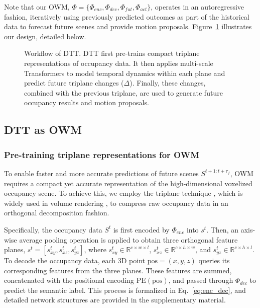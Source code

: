 \documentclass[11pt,a4paper]{article}
\begin{document}
Note that our OWM, $\Phi = \{\Phi_{enc}, \Phi_{dec}, \Phi_{fut}, \Phi_{act}\}$, operates in an autoregressive fashion, iteratively using previously predicted outcomes as part of the historical data to forecast future scenes and provide motion proposals.
Figure~\ref{fig:workflow} illustrates our design, detailed below.

\begin{figure}[htbp]
  \centering
  \caption{Workflow of DTT. DTT first pre-trains compact triplane representations of occupancy data. It then applies multi-scale Transformers to model temporal dynamics within each plane and predict future triplane changes ($\Delta$). Finally, these changes, combined with the previous triplane, are used to generate future occupancy results and motion proposals.}
  \label{fig:workflow}
\end{figure}

\subsection{DTT as OWM}

\subsubsection{Pre-training triplane representations for OWM}

To enable faster and more accurate predictions of future scenes $S^{t+1:t+\tau_f}$, OWM requires a compact yet accurate representation of the high-dimensional voxelized occupancy scene.
To achieve this, we employ the triplane technique \cite{juminlee2024}, which is widely used in volume rendering \cite{jryanshue2023,taohu2023,luchuansong2024,yuanhuihuang2023}, to compress raw occupancy data in an orthogonal decomposition fashion.

Specifically, the occupancy data $S^t$ is first encoded by $\Phi_{enc}$ into $s^t$.
Then, an axis-wise average pooling operation is applied to obtain three orthogonal feature planes,
$s^t = [s^t_{xy}, s^t_{xz}, s^t_{yz}]$, where $s^t_{xy} \in \mathbb{R}^{c \times w \times l}$, $s^t_{xz} \in \mathbb{R}^{c \times h \times w}$, and $s^t_{yz} \in \mathbb{R}^{c \times h \times l}$.
To decode the occupancy data, each 3D point $\text{pos} = (x, y, z)$ queries its corresponding features from the three planes.
These features are summed, concatenated with the positional encoding $\mathrm{PE}(\text{pos})$, and passed through $\Phi_{dec}$ to predict the semantic label.
This process is formalized in Eq.~\eqref{eq:enc_dec}, and detailed network structures are provided in the supplementary material.
\end{document}
